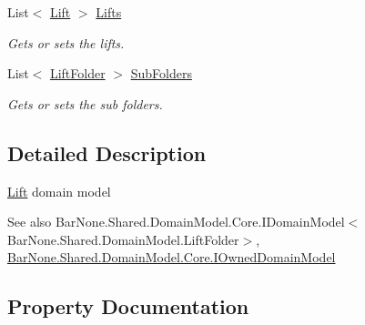 \begin{DoxyCompactItemize}
List$<$ \mbox{\hyperlink{class_bar_none_1_1_shared_1_1_domain_model_1_1_lift}{Lift}} $>$ \mbox{\hyperlink{class_bar_none_1_1_shared_1_1_domain_model_1_1_lift_folder_a55138cdb1f97d7a33b5ce8e3aaec28a8}{Lifts}}
\begin{DoxyCompactList}\small\item\em Gets or sets the lifts. \end{DoxyCompactList}\item 
List$<$ \mbox{\hyperlink{class_bar_none_1_1_shared_1_1_domain_model_1_1_lift_folder}{Lift\+Folder}} $>$ \mbox{\hyperlink{class_bar_none_1_1_shared_1_1_domain_model_1_1_lift_folder_a185742e96aceef5822f046c3c8874b28}{Sub\+Folders}}
\begin{DoxyCompactList}\small\item\em Gets or sets the sub folders. \end{DoxyCompactList}\end{DoxyCompactItemize}


\subsection{Detailed Description}
\mbox{\hyperlink{class_bar_none_1_1_shared_1_1_domain_model_1_1_lift}{Lift}} domain model 

\begin{DoxySeeAlso}{See also}
Bar\+None.\+Shared.\+Domain\+Model.\+Core.\+I\+Domain\+Model$<$\+Bar\+None.\+Shared.\+Domain\+Model.\+Lift\+Folder$>$, \mbox{\hyperlink{interface_bar_none_1_1_shared_1_1_domain_model_1_1_core_1_1_i_owned_domain_model}{Bar\+None.\+Shared.\+Domain\+Model.\+Core.\+I\+Owned\+Domain\+Model}}


\end{DoxySeeAlso}


\subsection{Property Documentation}
\mbox{\label{class_bar_none_1_1_shared_1_1_domain_model_1_1_lift_folder_afb690f83f4382a3b00f86b270f6f8bfb}} 
